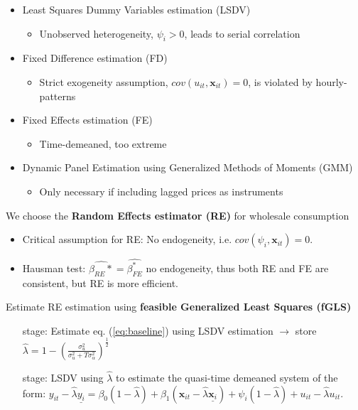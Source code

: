\begin{itemize}
    \item Least Squares Dummy Variables estimation (LSDV)
    \begin{itemize}
        \item Unobserved heterogeneity, $\psi_i>0$, leads to serial correlation
    \end{itemize}
    \item Fixed Difference estimation (FD)
    \begin{itemize}
        \item Strict exogeneity assumption, $cov(u_{it},\bm{x}_{it})=0$, is violated by hourly-patterns
    \end{itemize}
    \item Fixed Effects estimation (FE)
    \begin{itemize}
        \item Time-demeaned, too extreme
    \end{itemize}
    \item Dynamic Panel Estimation using Generalized Methods of Moments (GMM)
    \begin{itemize}
        \item Only necessary if including lagged prices as instruments
    \end{itemize}
\end{itemize}
We choose the \textbf{Random Effects estimator (RE)} for wholesale consumption
\begin{itemize}
    \item Critical assumption for RE: No endogeneity, i.e. $cov(\psi_i,\bm{x}_{it})=0$.
    \item Hausman test: $\widehat{\beta_{RE}{*}}=\widehat{\beta_{FE}^{*}}$ no endogeneity, thus both RE and FE are consistent, but RE is more efficient.
\end{itemize}
Estimate RE estimation using \textbf{feasible Generalized Least Squares (fGLS)}
\begin{itemize}
    \item[\nth{1} stage:] Estimate eq. (\ref{eq:baseline}) using LSDV estimation $\rightarrow$ store $\widehat{\lambda}=1-\left(\frac{\sigma^2_u}{\sigma^2_u+T\sigma^2_\alpha}\right)^\frac{1}{2}$
    \item[\nth{2} stage:] LSDV using $\widehat{\lambda}$ to estimate the quasi-time demeaned system of the form: $y_{it}-\widehat{\lambda}\underline{y_i}=\beta_0(1-\widehat{\lambda})+\beta_1(\bm{x}_{it}-\widehat{\lambda}\underline{\bm{x}_i})+\psi_i(1-\widehat{\lambda})+u_{it}-\widehat{\lambda}u_{it}$.
\end{itemize}

